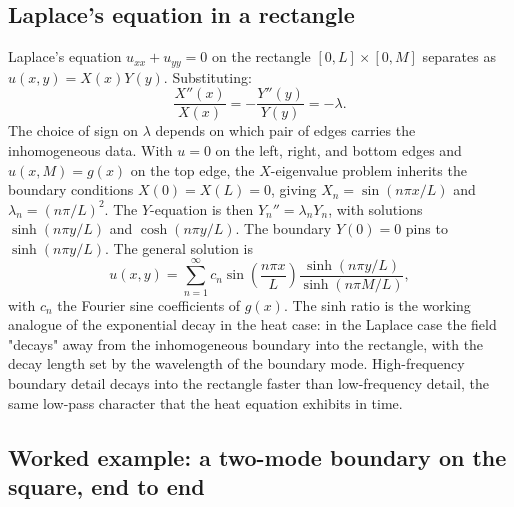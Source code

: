 \subsection{Laplace's equation in a rectangle}

Laplace's equation $u_{xx} + u_{yy} = 0$ on the rectangle $[0, L]
\times [0, M]$ separates as $u(x, y) = X(x) Y(y)$. Substituting:
\[
\frac{X''(x)}{X(x)} = -\frac{Y''(y)}{Y(y)} = -\lambda.
\]
The choice of sign on $\lambda$ depends on which pair of edges
carries the inhomogeneous data. With $u = 0$ on the left, right,
and bottom edges and $u(x, M) = g(x)$ on the top edge, the
$X$-eigenvalue problem inherits the boundary conditions $X(0) =
X(L) = 0$, giving $X_{n} = \sin(n\pi x/L)$ and $\lambda_{n} =
(n\pi/L)^{2}$. The $Y$-equation is then $Y_{n}'' = \lambda_{n}
Y_{n}$, with solutions $\sinh(n\pi y/L)$ and $\cosh(n\pi y/L)$.
The boundary $Y(0) = 0$ pins to $\sinh(n\pi y/L)$. The general
solution is
\[
u(x, y) = \sum_{n = 1}^{\infty} c_{n} \sin\!\left(\frac{n \pi x}{L}\right) \frac{\sinh(n \pi y/L)}{\sinh(n \pi M/L)},
\]
with $c_{n}$ the Fourier sine coefficients of $g(x)$. The sinh
ratio is the working analogue of the exponential decay in the
heat case: in the Laplace case the field "decays" away from the
inhomogeneous boundary into the rectangle, with the decay length
set by the wavelength of the boundary mode. High-frequency
boundary detail decays into the rectangle faster than low-frequency
detail, the same low-pass character that the heat equation
exhibits in time.

\subsection{Worked example: a two-mode boundary on the square, end to end}

